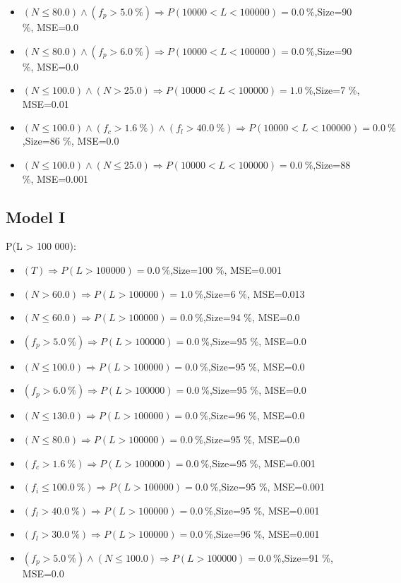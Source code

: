 \documentclass[numbered]{CSL}
\begin{document}
\begin{itemize}
\item $(N \leq 80.0) \land (f_p > 5.0~\%) \Rightarrow P(10 000 < L < 100 000) = 0.0~\%$,\hfill Size=90 \%, MSE=0.0
\item $(N \leq 80.0) \land (f_p > 6.0~\%) \Rightarrow P(10 000 < L < 100 000) = 0.0~\%$,\hfill Size=90 \%, MSE=0.0
\item $(N \leq 100.0) \land (N > 25.0) \Rightarrow P(10 000 < L < 100 000) = 1.0~\%$,\hfill Size=7 \%, MSE=0.01
\item $(N \leq 100.0) \land (f_c > 1.6~\%) \land (f_l > 40.0~\%) \Rightarrow P(10 000 < L < 100 000) = 0.0~\%$,\hfill Size=86 \%, MSE=0.0
\item $(N \leq 100.0) \land (N \leq 25.0) \Rightarrow P(10 000 < L < 100 000) = 0.0~\%$,\hfill Size=88 \%, MSE=0.001
\end{itemize}

\subsection{Model I}
P(L > 100 000):
\begin{itemize}
\item $(T) \Rightarrow P(L > 100 000) = 0.0~\%$,\hfill Size=100 \%, MSE=0.001
\item $(N > 60.0) \Rightarrow P(L > 100 000) = 1.0~\%$,\hfill Size=6 \%, MSE=0.013
\item $(N \leq 60.0) \Rightarrow P(L > 100 000) = 0.0~\%$,\hfill Size=94 \%, MSE=0.0
\item $(f_p > 5.0~\%) \Rightarrow P(L > 100 000) = 0.0~\%$,\hfill Size=95 \%, MSE=0.0
\item $(N \leq 100.0) \Rightarrow P(L > 100 000) = 0.0~\%$,\hfill Size=95 \%, MSE=0.0
\item $(f_p > 6.0~\%) \Rightarrow P(L > 100 000) = 0.0~\%$,\hfill Size=95 \%, MSE=0.0
\item $(N \leq 130.0) \Rightarrow P(L > 100 000) = 0.0~\%$,\hfill Size=96 \%, MSE=0.0
\item $(N \leq 80.0) \Rightarrow P(L > 100 000) = 0.0~\%$,\hfill Size=95 \%, MSE=0.0
\item $(f_c > 1.6~\%) \Rightarrow P(L > 100 000) = 0.0~\%$,\hfill Size=95 \%, MSE=0.001
\item $(f_i \leq 100.0~\%) \Rightarrow P(L > 100 000) = 0.0~\%$,\hfill Size=95 \%, MSE=0.001
\item $(f_l > 40.0~\%) \Rightarrow P(L > 100 000) = 0.0~\%$,\hfill Size=95 \%, MSE=0.001
\item $(f_l > 30.0~\%) \Rightarrow P(L > 100 000) = 0.0~\%$,\hfill Size=96 \%, MSE=0.001
\item $(f_p > 5.0~\%) \land (N \leq 100.0) \Rightarrow P(L > 100 000) = 0.0~\%$,\hfill Size=91 \%, MSE=0.0
\end{itemize}
\end{document}
